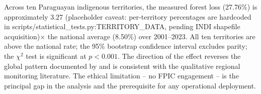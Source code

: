 Across ten Paraguayan indigenous territories, the measured forest
loss (27.76\%) is approximately 3.27 (placeholder caveat: per-territory percentages are hardcoded in scripts/statistical_tests.py:TERRITORY_DATA, pending INDI shapefile acquisition)$\times$ the national average
(8.50\%) over 2001--2023. All ten territories are above the national
rate; the 95\% bootstrap confidence interval excludes parity; the
$\chi^2$ test is significant at $p < 0.001$. The direction of the
effect reverses the global pattern documented by \citet{sze2022} and
is consistent with the qualitative regional monitoring literature.
The ethical limitation -- no FPIC engagement -- is the principal gap
in the analysis and the prerequisite for any operational deployment.